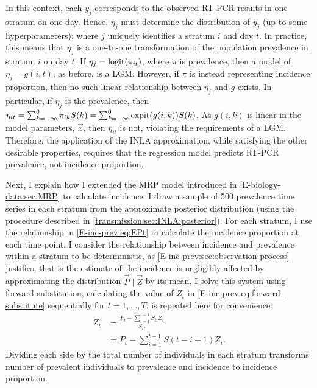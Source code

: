 \documentclass[thesis.tex]{subfiles}
\begin{document}
In this context, each $y_j$ corresponds to the observed RT-PCR results in one stratum on one day.
Hence, $\eta_{j}$ must determine the distribution of $y_{j}$ (up to some hyperparameters); where $j$ uniquely identifies a stratum $i$ and day $t$.
In practice, this means that $\eta_j$ is a one-to-one transformation of the population prevalence in stratum $i$ on day $t$.
If $\eta_j = \operatorname{logit}(\pi_{it})$, where $\pi$ is prevalence, then a model of $\eta_j = g(i, t)$, as before, is a LGM.
However, if $\pi$ is instead representing incidence proportion, then no such linear relationship between $\eta_j$ and $g$ exists.
In particular, if $\eta_j$ is the prevalence, then $\eta_{it} = \sum_{k=-\infty}^0 \pi_{ik} S(k) = \sum_{k=-\infty}^0 \operatorname{expit}(g(i, k)) S(k)$.
As $g(i, k)$ is linear in the model parameters, $\vec{x}$, then $\eta_{it}$ is not, violating the requirements of a LGM.
Therefore, the application of the INLA approximation, while satisfying the other desirable properties, requires that the regression model predicts RT-PCR prevalence, not incidence proportion.

Next, I explain how I extended the MRP model introduced in \cref{E-biology-data:sec:MRP} to calculate incidence.
I draw a sample of 500 prevalence time series in each stratum from the approximate posterior distribution (using the procedure described in \cref{transmission:sec:INLA:posterior}).
For each stratum, I use the relationship in \cref{E-inc-prev:eq:EPt} to calculate the incidence proportion at each time point.
I consider the relationship between incidence and prevalence within a stratum to be deterministic, as \cref{E-inc-prev:sec:observation-process} justifies, that is the estimate of the incidence is negligibly affected by approximating the distribution $\vec{P} \mid \vec{Z}$ by its mean.
I solve this system using forward substitution, calculating the value of $Z_t$ in \cref{E-inc-prev:eq:forward-substitute} sequentially for $t = 1, \dots, T$.
 is repeated here for convenience:
\begin{align}
Z_t
&= \frac{P_t - \sum_{i=1}^{t-1} S_{ti} Z_i}{S_{tt}} \\
&= P_t - \sum_{i=1}^{t-1} S(t - i + 1) Z_i.
\label{transmission:eq:forward-substitute}
\end{align}
Dividing each side by the total number of individuals in each stratum transforms number of prevalent individuals to prevalence and incidence to incidence proportion.
\end{document}
